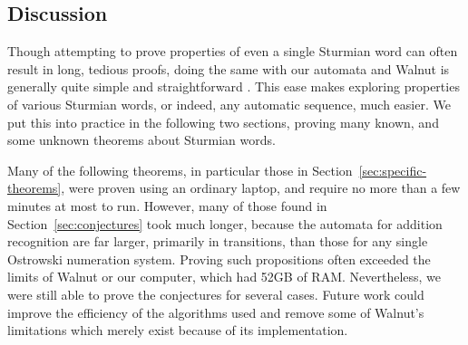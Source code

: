 \subsection{Discussion}

Though attempting to prove properties of even a single Sturmian word can often result in long, tedious proofs, doing the same with our automata and Walnut is generally quite simple and straightforward .
This ease makes exploring properties of various Sturmian words, or indeed, any automatic sequence, much easier.
We put this into practice in the following two sections, proving many known, and some unknown  theorems about Sturmian words.

Many of the following theorems, in particular those in Section~\ref{sec:specific-theorems}, were proven using an ordinary laptop, and require no more than a few minutes at most to run.
However, many  of those found in Section~\ref{sec:conjectures} took much longer, because the automata for addition recognition are far larger, primarily in transitions, than those for any single Ostrowski numeration system.
Proving such propositions often exceeded the limits of Walnut or our computer, which had 52GB of RAM.
Nevertheless, we were still able to prove the conjectures for several cases.
Future work could improve the efficiency of the algorithms used and remove some of Walnut's limitations which merely exist because of its implementation.
